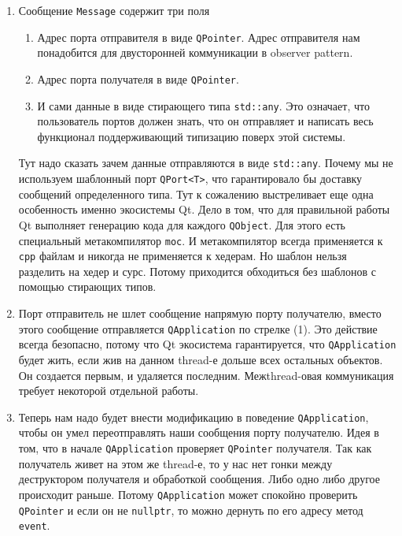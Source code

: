 \begin{enumerate}
\item Сообщение \verb"Message" содержит три поля
\begin{enumerate}
\item Адрес порта отправителя в виде \verb"QPointer".
Адрес отправителя нам понадобится для двусторонней коммуникации в observer pattern.

\item Адрес порта получателя в виде \verb"QPointer".

\item И сами данные в виде стирающего типа \verb"std::any".
Это означает, что пользователь портов должен знать, что он отправляет и написать весь функционал поддерживающий типизацию поверх этой системы.
\end{enumerate}
Тут надо сказать зачем данные отправляются в виде \verb"std::any".
Почему мы не используем шаблонный порт \verb"QPort<T>", что гарантировало бы доставку сообщений определенного типа.
Тут к сожалению выстреливает еще одна особенность именно экосистемы Qt.
Дело в том, что для правильной работы Qt выполняет генерацию кода для каждого \verb"QObject".
Для этого есть специальный метакомпилятор \verb"moc".
И метакомпилятор всегда применяется к \verb"cpp" файлам и никогда не применяется к хедерам.
Но шаблон нельзя разделить на хедер и сурс.
Потому приходится обходиться без шаблонов с помощью стирающих типов.

\item Порт отправитель не шлет сообщение напрямую порту получателю, вместо этого сообщение отправляется \verb"QApplication" по стрелке (1).
Это действие всегда безопасно, потому что Qt экосистема гарантируется, что \verb"QApplication" будет жить, если жив на данном thread-е дольше всех остальных объектов.
Он создается первым, и удаляется последним.
Межthread-овая коммуникация требует некоторой отдельной работы.

\item Теперь нам надо будет внести модификацию в поведение \verb"QApplication", чтобы он умел переотправлять наши сообщения порту получателю.
Идея в том, что в начале \verb"QApplication" проверяет \verb"QPointer" получателя.
Так как получатель живет на этом же thread-е, то у нас нет гонки между деструктором получателя и обработкой сообщения.
Либо одно либо другое происходит раньше.
Потому \verb"QApplication" может спокойно проверить \verb"QPointer" и если он не \verb"nullptr", то можно дернуть по его адресу метод \verb"event".
\end{enumerate}

